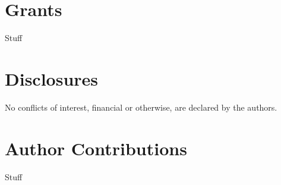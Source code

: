 \documentclass[12pt]{article}
\begin{document}
\section*{Grants}


Stuff


\section*{Disclosures}

No conflicts of interest, financial or otherwise, are declared by the authors.




\section*{Author Contributions}

Stuff




\nocite{}
\nocite{}
\nocite{}

\printbibliography
\end{document}
